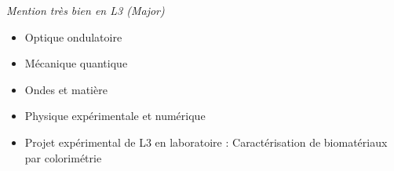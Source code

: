 \documentclass[9pt,a4paper,academicons]{altacv}
\begin{document}
\textit{Mention très bien en L3 (Major)}\smallskip
\small{
  \begin{itemize}
    \item Optique ondulatoire
    \item Mécanique quantique
    \item Ondes et matière
    \item Physique expérimentale et numérique
    \item Projet expérimental de L3 en laboratoire : Caractérisation de biomatériaux par colorimétrie
  \end{itemize}
}







\medskip


\newpage
\end{document}
